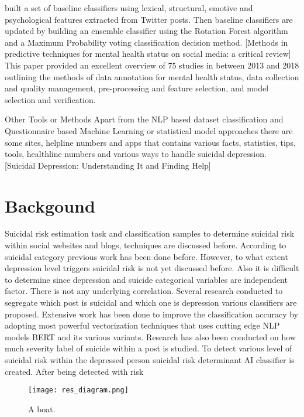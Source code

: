 \documentclass[12pt, letterpaper]{article}
\begin{document}
\cite{burnap2015machine}built a set of baseline classifiers using lexical, structural, emotive and psychological features extracted from Twitter posts. Then baseline classifiers are updated by building an ensemble classifier using the Rotation Forest algorithm and a Maximum Probability voting classification decision method. 
[Methods in predictive techniques for mental health status on social media: a critical review]
This paper provided an excellent overview of 75 studies in between 2013 and 2018 outlining the methods of data annotation for mental health status, data collection and quality management, pre-processing and feature selection, and model selection and verification. 

Other Tools or Methods
Apart from the NLP based dataset classification and Questionnaire based Machine Learning or statistical model approaches there are some sites, helpline numbers and apps \cite{martinengo2019suicide} that contains various facts, statistics, tips, tools, healthline numbers and various ways to handle suicidal depression. [Suicidal Depression: Understanding It and Finding Help]
  


\section{Backgound}\label{sec2}


Suicidal risk estimation task and classification samples to determine suicidal risk within social websites and blogs, techniques are discussed before. According to suicidal category previous work has been done before. However, to what extent depression level triggers suicidal risk is not yet discussed before. Also it is difficult to determine since depression and suicide categorical variables are independent factor. There is not any underlying correlation. Several research conducted to segregate which post is suicidal and which one is depression various classifiers are proposed. Extensive work has been done to improve the classification accuracy by adopting most powerful vectorization techniques that uses cutting edge NLP models BERT and its various variants. Research has also been conducted on how much severity label of suicide within a post is studied. 
To detect various level of suicidal risk within the depressed person suicidal risk determinant AI classifier is created. After being detected with risk 

\begin{figure}[H]
  \texttt{[image: res\_diagram.png]}
  \caption{A boat.}
  \label{fig:boat1}
\end{figure}
\end{document}
